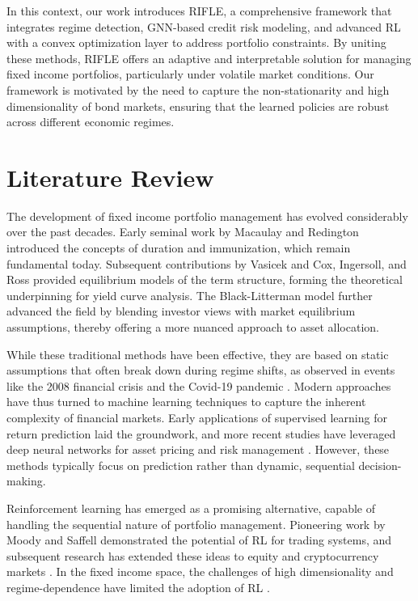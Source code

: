 \documentclass[
  a4paper,
  10pt,
  unnumberedsections,
  twoside,
]{LTJournalArticle}
\begin{document}
In this context, our work introduces RIFLE, a comprehensive framework that integrates regime detection, GNN-based credit risk modeling, and advanced RL with a convex optimization layer to address portfolio constraints. By uniting these methods, RIFLE offers an adaptive and interpretable solution for managing fixed income portfolios, particularly under volatile market conditions. Our framework is motivated by the need to capture the non-stationarity and high dimensionality of bond markets, ensuring that the learned policies are robust across different economic regimes. 

\section{Literature Review}
The development of fixed income portfolio management has evolved considerably over the past decades. Early seminal work by Macaulay \cite{macaulay1938} and Redington \cite{redington1952} introduced the concepts of duration and immunization, which remain fundamental today. Subsequent contributions by Vasicek \cite{vasicek1977} and Cox, Ingersoll, and Ross \cite{cox1985} provided equilibrium models of the term structure, forming the theoretical underpinning for yield curve analysis. The Black-Litterman model \cite{litterman1991} further advanced the field by blending investor views with market equilibrium assumptions, thereby offering a more nuanced approach to asset allocation.

While these traditional methods have been effective, they are based on static assumptions that often break down during regime shifts, as observed in events like the 2008 financial crisis and the Covid-19 pandemic \cite{bansal2002, glasserman2016}. Modern approaches have thus turned to machine learning techniques to capture the inherent complexity of financial markets. Early applications of supervised learning for return prediction \cite{krauss2017, bianchi2018} laid the groundwork, and more recent studies have leveraged deep neural networks for asset pricing and risk management \cite{heaton2017, gu2020}. However, these methods typically focus on prediction rather than dynamic, sequential decision-making.

Reinforcement learning has emerged as a promising alternative, capable of handling the sequential nature of portfolio management. Pioneering work by Moody and Saffell \cite{moody1998} demonstrated the potential of RL for trading systems, and subsequent research has extended these ideas to equity and cryptocurrency markets \cite{jiang2017, yu2019}. In the fixed income space, the challenges of high dimensionality and regime-dependence have limited the adoption of RL \cite{kolm2019, kalayci2021}. 
\end{document}
